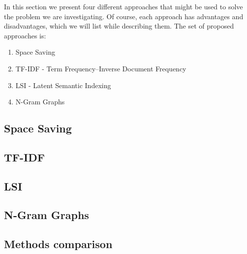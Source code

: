 In this section we present four different approaches that might be used to solve the problem we are investigating. 
Of course, each approach has advantages and disadvantages, which we will list while describing them.
The set of proposed approaches is:
\begin{enumerate}
	\item Space Saving
	\item TF-IDF - Term Frequency–Inverse Document Frequency
	\item LSI - Latent Semantic Indexing
	\item N-Gram Graphs
\end{enumerate}


\subsection{Space Saving}


\subsection{TF-IDF}


\subsection{LSI}


\subsection{N-Gram Graphs}


\subsection*{Methods comparison}

